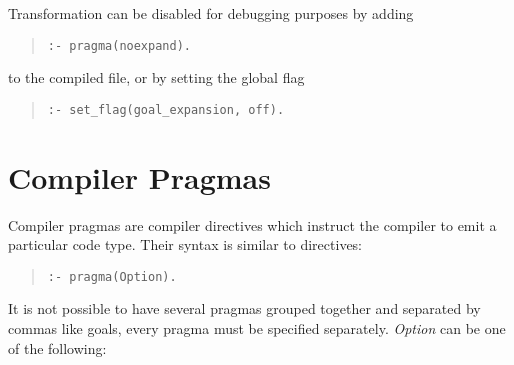 Transformation can be disabled for debugging purposes by adding
\begin{quote} \begin{verbatim}
:- pragma(noexpand).
\end{verbatim} \end{quote}
to the compiled file, or by setting the global flag
\begin{quote} \begin{verbatim}
:- set_flag(goal_expansion, off).
\end{verbatim} \end{quote}



\section{Compiler Pragmas}
Compiler pragmas are compiler directives which instruct the compiler
to emit a particular code type.
Their syntax is similar to directives:
\begin{quote}
\begin{verbatim}
:- pragma(Option).
\end{verbatim}
\end{quote}
It is not possible to have several pragmas grouped together and separated
by commas like goals, every pragma must be specified separately.
{\it Option} can be one of the following:

